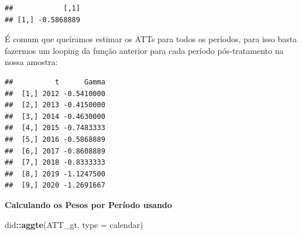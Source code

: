 \documentclass[portugues]{article}
\newenvironment{Shaded}{\begin{snugshade}}{\end{snugshade}}
\newcommand{\AttributeTok}[1]{\textcolor[rgb]{0.13,0.29,0.53}{#1}}
\newcommand{\CommentTok}[1]{\textcolor[rgb]{0.56,0.35,0.01}{\textit{#1}}}
\newcommand{\ConstantTok}[1]{\textcolor[rgb]{0.56,0.35,0.01}{#1}}
\newcommand{\ControlFlowTok}[1]{\textcolor[rgb]{0.13,0.29,0.53}{\textbf{#1}}}
\newcommand{\FunctionTok}[1]{\textcolor[rgb]{0.13,0.29,0.53}{\textbf{#1}}}
\newcommand{\NormalTok}[1]{#1}
\newcommand{\OtherTok}[1]{\textcolor[rgb]{0.56,0.35,0.01}{#1}}
\newcommand{\SpecialCharTok}[1]{\textcolor[rgb]{0.81,0.36,0.00}{\textbf{#1}}}
\newcommand{\StringTok}[1]{\textcolor[rgb]{0.31,0.60,0.02}{#1}}
\begin{document}
\begin{box_code}
\begin{verbatim}
##            [,1]
## [1,] -0.5868889
\end{verbatim}

É comum que queíramos estimar os ATTs para todos os períodos, para isso basta fazermos um looping da função anterior para cada período pós-tratamento na nossa amostra:

\begin{Shaded}
\end{Shaded}

\begin{verbatim}
##          t      Gamma
##  [1,] 2012 -0.5410000
##  [2,] 2013 -0.4150000
##  [3,] 2014 -0.4630000
##  [4,] 2015 -0.7483333
##  [5,] 2016 -0.5868889
##  [6,] 2017 -0.8608889
##  [7,] 2018 -0.8333333
##  [8,] 2019 -1.1247500
##  [9,] 2020 -1.2691667
\end{verbatim}

\noindent \textbf{Calculando os Pesos por Período usando \cite{callaway2021difference}}

\begin{Shaded}
\begin{Highlighting}[]
\NormalTok{did}\SpecialCharTok{::}\FunctionTok{aggte}\NormalTok{(ATT\_gt, }\AttributeTok{type =} \StringTok{\textquotesingle{}calendar\textquotesingle{}}\NormalTok{)}
\end{Highlighting}
\end{Shaded}


\end{box_code}
\end{document}
